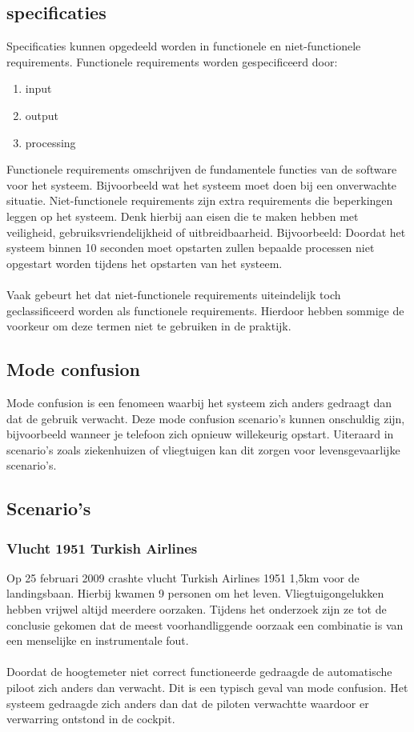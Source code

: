 \subsection{specificaties}
Specificaties kunnen opgedeeld worden in functionele en niet-functionele requirements. Functionele requirements worden gespecificeerd door: 
\begin{enumerate}
\item input
\item output
\item processing
\end{enumerate}
Functionele requirements omschrijven de fundamentele functies van de software voor het systeem. Bijvoorbeeld wat het systeem moet doen bij een onverwachte situatie. Niet-functionele requirements zijn extra requirements die beperkingen leggen op het systeem. Denk hierbij aan eisen die te maken hebben met veiligheid, gebruiksvriendelijkheid of uitbreidbaarheid. Bijvoorbeeld: Doordat het systeem binnen 10 seconden moet opstarten zullen bepaalde processen niet opgestart worden tijdens het opstarten van het systeem. \\\\
Vaak gebeurt het dat niet-functionele requirements uiteindelijk toch geclassificeerd worden als functionele requirements. Hierdoor hebben sommige de voorkeur om deze termen niet te gebruiken in de praktijk\cite{loucopoulos1995system}.
\newpage
\subsection{Mode confusion}
Mode confusion is een fenomeen waarbij het systeem zich anders gedraagt dan dat de gebruik verwacht. Deze mode confusion scenario's kunnen onschuldig zijn, bijvoorbeeld wanneer je telefoon zich opnieuw willekeurig opstart. Uiteraard in scenario's zoals ziekenhuizen of vliegtuigen kan dit zorgen voor levensgevaarlijke scenario's. \cite{modeconfusion}

\subsection{Scenario's}
\subsubsection*{Vlucht 1951 Turkish Airlines}
Op 25 februari 2009 crashte vlucht Turkish Airlines 1951 1,5km voor de landingsbaan. Hierbij kwamen 9 personen om het leven. Vliegtuigongelukken hebben vrijwel altijd meerdere oorzaken. Tijdens het onderzoek zijn ze tot de conclusie gekomen dat de meest voorhandliggende oorzaak een combinatie is van een menselijke en instrumentale fout. \\\\
Doordat de hoogtemeter niet correct functioneerde gedraagde de automatische piloot zich anders dan verwacht. Dit is een typisch geval van mode confusion. Het systeem gedraagde zich anders dan dat de piloten verwachtte waardoor er verwarring ontstond in de cockpit.
